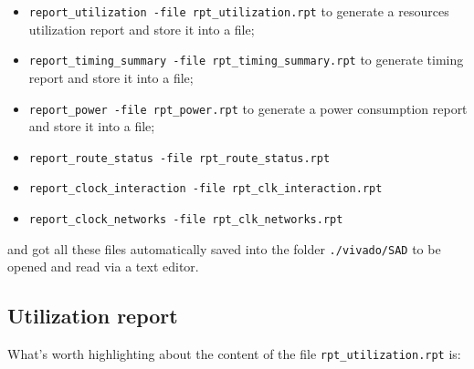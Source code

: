 \documentclass[12pt, a4paper]{article}
\begin{document}
\begin{itemize}

\item \texttt{report\_utilization -file rpt\_utilization.rpt} to generate a resources utilization report and store it into a file;

\item \texttt{report\_timing\_summary -file rpt\_timing\_summary.rpt} to generate timing report and store it into a file;

\item \texttt{report\_power -file rpt\_power.rpt} to generate a power consumption report and store it into a file;

\item \texttt{report\_route\_status -file rpt\_route\_status.rpt} 

\item \texttt{report\_clock\_interaction -file rpt\_clk\_interaction.rpt}

\item \texttt{report\_clock\_networks -file rpt\_clk\_networks.rpt}

\end{itemize}



and got all these files automatically saved into the folder \texttt{./vivado/SAD} to be opened and read via a text editor.

\subsection{Utilization report}
What's worth highlighting about the content of the file \texttt{rpt\_utilization.rpt} is:
\end{document}
